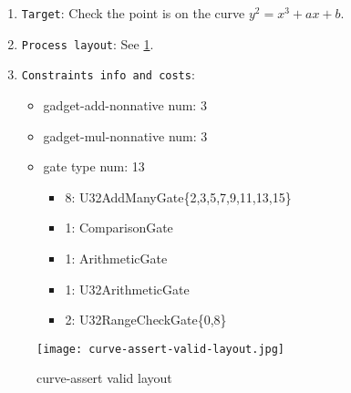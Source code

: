 
\begin{enumerate}
    \item \verb|Target|: Check the point is on the curve $y^2 = x^3 + ax + b$.
    \item \verb|Process layout|: See \ref{fig:curve-assert-valid-layout}.
    \item \verb|Constraints info and costs|:
    \begin{itemize}
        \item gadget-add-nonnative num: 3
        \item gadget-mul-nonnative num: 3
        \item gate type num: 13
            \begin{itemize}
                \item 8: U32AddManyGate\{2,3,5,7,9,11,13,15\}
                \item 1: ComparisonGate
                \item 1: ArithmeticGate
                \item 1: U32ArithmeticGate
                \item 2: U32RangeCheckGate\{0,8\}
            \end{itemize}
    \end{itemize}
\end{enumerate}

\begin{figure}[!ht]
    \centering
    \texttt{[image: curve-assert-valid-layout.jpg]}
    \caption{curve-assert valid layout}
    \label{fig:curve-assert-valid-layout}
\end{figure}
